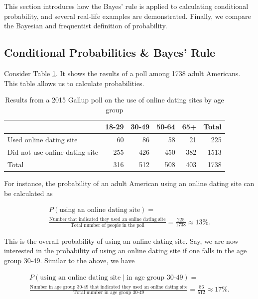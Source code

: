 \documentclass[]{book}
\theoremstyle{definition}
\theoremstyle{definition}
\theoremstyle{definition}
\theoremstyle{remark}
\begin{document}
This section introduces how the Bayes' rule is applied to calculating
conditional probability, and several real-life examples are
demonstrated. Finally, we compare the Bayesian and frequentist
definition of probability.

\subsection{Conditional Probabilities \& Bayes'
Rule}\label{sec:bayes-rule}

Consider Table \ref{tab:2015gallupDating}. It shows the results of a
poll among 1738 adult Americans. This table allows us to calculate
probabilities.

\begin{table}

\caption{\label{tab:2015gallupDating}Results from a 2015 Gallup poll on the use of online dating sites by age group}
\centering
\begin{tabular}[t]{lrrrrr}
\toprule
  & 18-29 & 30-49 & 50-64 & 65+ & Total\\
\midrule
Used online dating site & 60 & 86 & 58 & 21 & 225\\
Did not use online dating site & 255 & 426 & 450 & 382 & 1513\\
Total & 316 & 512 & 508 & 403 & 1738\\
\bottomrule
\end{tabular}
\end{table}

For instance, the probability of an adult American using an online
dating site can be calculated as

\begin{multline*}
    P(\text{using an online dating site}) = \\
    \frac{\text{Number that indicated they used an online dating site}}{\text{Total number of people in the poll}}
    = \frac{225}{1738} \approx 13\%.
\end{multline*}

This is the overall probability of using an online dating site. Say, we
are now interested in the probability of using an online dating site if
one falls in the age group 30-49. Similar to the above, we have

\begin{multline*}
    P(\text{using an online dating site} \mid \text{in age group 30-49}) = \\
    \frac{\text{Number in age group 30-49 that indicated they used an online dating site}}{\text{Total number in age group 30-49}}
    = \frac{86}{512} \approx 17\%.
\end{multline*}
\end{document}

